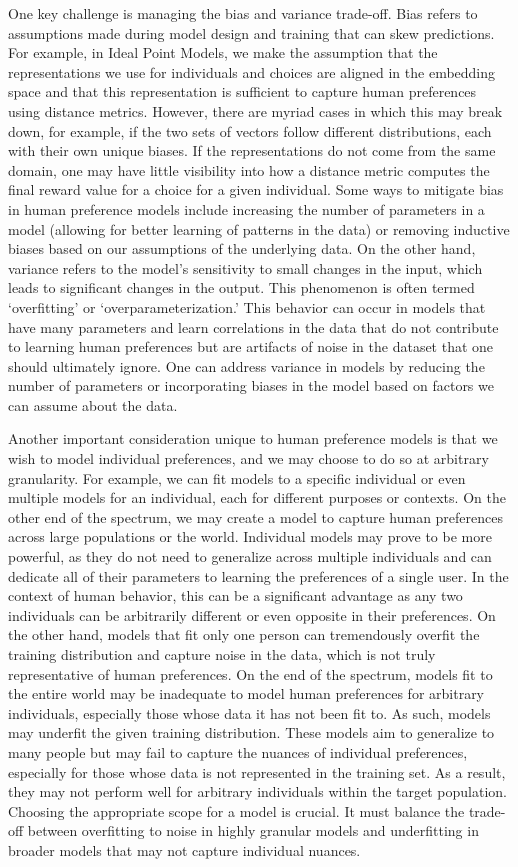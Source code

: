 \documentclass[
  letterpaper,
  numbers=noenddot,
  DIV=11]{scrreprt}
\theoremstyle{plain}
\theoremstyle{definition}
\theoremstyle{remark}
\begin{document}
One key challenge is managing the bias and variance trade-off. Bias
refers to assumptions made during model design and training that can
skew predictions. For example, in Ideal Point Models, we make the
assumption that the representations we use for individuals and choices
are aligned in the embedding space and that this representation is
sufficient to capture human preferences using distance metrics. However,
there are myriad cases in which this may break down, for example, if the
two sets of vectors follow different distributions, each with their own
unique biases. If the representations do not come from the same domain,
one may have little visibility into how a distance metric computes the
final reward value for a choice for a given individual. Some ways to
mitigate bias in human preference models include increasing the number
of parameters in a model (allowing for better learning of patterns in
the data) or removing inductive biases based on our assumptions of the
underlying data. On the other hand, variance refers to the model's
sensitivity to small changes in the input, which leads to significant
changes in the output. This phenomenon is often termed `overfitting' or
`overparameterization.' This behavior can occur in models that have many
parameters and learn correlations in the data that do not contribute to
learning human preferences but are artifacts of noise in the dataset
that one should ultimately ignore. One can address variance in models by
reducing the number of parameters or incorporating biases in the model
based on factors we can assume about the data.

Another important consideration unique to human preference models is
that we wish to model individual preferences, and we may choose to do so
at arbitrary granularity. For example, we can fit models to a specific
individual or even multiple models for an individual, each for different
purposes or contexts. On the other end of the spectrum, we may create a
model to capture human preferences across large populations or the
world. Individual models may prove to be more powerful, as they do not
need to generalize across multiple individuals and can dedicate all of
their parameters to learning the preferences of a single user. In the
context of human behavior, this can be a significant advantage as any
two individuals can be arbitrarily different or even opposite in their
preferences. On the other hand, models that fit only one person can
tremendously overfit the training distribution and capture noise in the
data, which is not truly representative of human preferences. On the end
of the spectrum, models fit to the entire world may be inadequate to
model human preferences for arbitrary individuals, especially those
whose data it has not been fit to. As such, models may underfit the
given training distribution. These models aim to generalize to many
people but may fail to capture the nuances of individual preferences,
especially for those whose data is not represented in the training set.
As a result, they may not perform well for arbitrary individuals within
the target population. Choosing the appropriate scope for a model is
crucial. It must balance the trade-off between overfitting to noise in
highly granular models and underfitting in broader models that may not
capture individual nuances.
\end{document}
